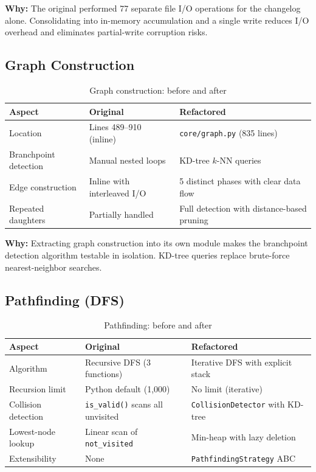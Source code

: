 \documentclass[11pt,a4paper]{article}
\begin{document}
\textbf{Why:} The original performed 77 separate file I/O operations for the changelog alone. Consolidating into in-memory accumulation and a single write reduces I/O overhead and eliminates partial-write corruption risks.

\subsection{Graph Construction}

\begin{table}[H]
\centering
\caption{Graph construction: before and after}
\begin{tabularx}{\textwidth}{lXX}
\toprule
\textbf{Aspect} & \textbf{Original} & \textbf{Refactored} \\
\midrule
Location & Lines 489--910 (inline) & \texttt{core/graph.py} (835 lines) \\
Branchpoint detection & Manual nested loops & KD-tree $k$-NN queries \\
Edge construction & Inline with interleaved I/O & 5 distinct phases with clear data flow \\
Repeated daughters & Partially handled & Full detection with distance-based pruning \\
\bottomrule
\end{tabularx}
\end{table}

\textbf{Why:} Extracting graph construction into its own module makes the branchpoint detection algorithm testable in isolation. KD-tree queries replace brute-force nearest-neighbor searches.

\subsection{Pathfinding (DFS)}

\begin{table}[H]
\centering
\caption{Pathfinding: before and after}
\begin{tabularx}{\textwidth}{lXX}
\toprule
\textbf{Aspect} & \textbf{Original} & \textbf{Refactored} \\
\midrule
Algorithm & Recursive DFS (3 functions) & Iterative DFS with explicit stack \\
Recursion limit & Python default (1,000) & No limit (iterative) \\
Collision detection & \texttt{is\_valid()} scans all unvisited & \texttt{CollisionDetector} with KD-tree \\
Lowest-node lookup & Linear scan of \texttt{not\_visited} & Min-heap with lazy deletion \\
Extensibility & None & \texttt{PathfindingStrategy} ABC \\
\bottomrule
\end{tabularx}
\end{table}
\end{document}
